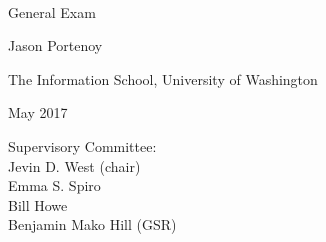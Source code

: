 \documentclass[11pt,article]{memoir}
\begin{document}
{ %
\sffamily
\centering
\Large

~\vspace{1in}

{\Huge
General Exam
}

\vspace{1in}

{\huge
Jason Portenoy
}

\vspace{.5in}

The Information School, University of Washington

\vspace{.5in}

May 2017

\vspace{1.5in}
{\small
Supervisory Committee: \\
Jevin D. West (chair) \\
Emma S. Spiro \\
Bill Howe \\
Benjamin Mako Hill (GSR) \\
}

\vspace{\fill}

} %

\clearpage

\tableofcontents

\clearpage

% 

\clearpage

\clearpage

\clearpage

\clearpage

\clearpage

\clearpage

\printbibliography
	
\end{document}
